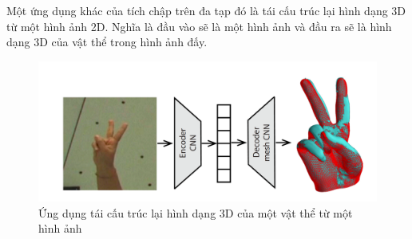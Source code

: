 Một ứng dụng khác của tích chập trên đa tạp đó là tái cấu trúc lại hình dạng 3D từ một hình ảnh 2D. Nghĩa là đầu vào sẽ là một hình ảnh và đầu ra sẽ là hình dạng 3D của vật thể trong hình ảnh đấy\cite{geometricdeep2022}.

\begin{figure}[H]
    \centering
    \includegraphics[width=1\linewidth]{Images/GDL/manifold_mesh/mani_cnn/3d_hand.png}
    \caption{Ứng dụng tái cấu trúc lại hình dạng 3D của một vật thể từ một hình ảnh\cite{geometricdeep2022}}
\end{figure}

